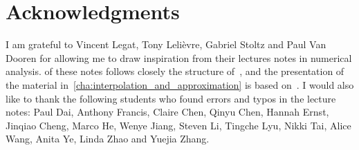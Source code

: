 \chapter*{Acknowledgments}%
\label{cha:acknowledgements}

I am grateful to Vincent Legat, Tony Lelièvre, Gabriel Stoltz and Paul Van Dooren for allowing me to draw inspiration from their lectures notes in numerical analysis.
 of these notes follows closely the structure of~\cite[Chapter 3]{VanDooren},
and the presentation of the material in~\cref{cha:interpolation_and_approximation} is based on~\cite{Legat}.
I would also like to thank the following students who found errors and typos in the lecture notes:
Paul Dai, Anthony Francis, Claire Chen, Qinyu Chen, Hannah Ernst, Jinqiao Cheng, Marco He, Wenye Jiang, Steven Li, Tingche Lyu, Nikki Tai, Alice Wang, Anita Ye, Linda Zhao and Yuejia Zhang.
